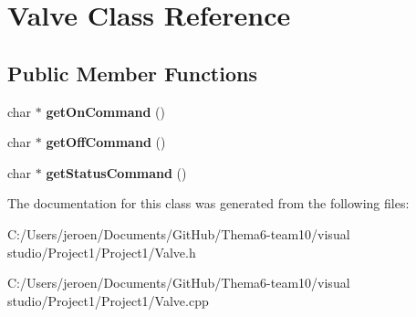 \hypertarget{class_valve}{}\section{Valve Class Reference}
\label{class_valve}
\subsection*{Public Member Functions}
\begin{DoxyCompactItemize}
\item 
char $\ast$ {\bfseries get\+On\+Command} ()\hypertarget{class_valve_a8057b905b4cfa606276f3b16050e5836}{}\label{class_valve_a8057b905b4cfa606276f3b16050e5836}

\item 
char $\ast$ {\bfseries get\+Off\+Command} ()\hypertarget{class_valve_ad0bbc411022b245629195ad969b64d39}{}\label{class_valve_ad0bbc411022b245629195ad969b64d39}

\item 
char $\ast$ {\bfseries get\+Status\+Command} ()\hypertarget{class_valve_a3d710f8998e859773bd799e66f785a3d}{}\label{class_valve_a3d710f8998e859773bd799e66f785a3d}

\end{DoxyCompactItemize}


The documentation for this class was generated from the following files\+:\begin{DoxyCompactItemize}
\item 
C\+:/\+Users/jeroen/\+Documents/\+Git\+Hub/\+Thema6-\/team10/visual studio/\+Project1/\+Project1/Valve.\+h\item 
C\+:/\+Users/jeroen/\+Documents/\+Git\+Hub/\+Thema6-\/team10/visual studio/\+Project1/\+Project1/Valve.\+cpp\end{DoxyCompactItemize}
